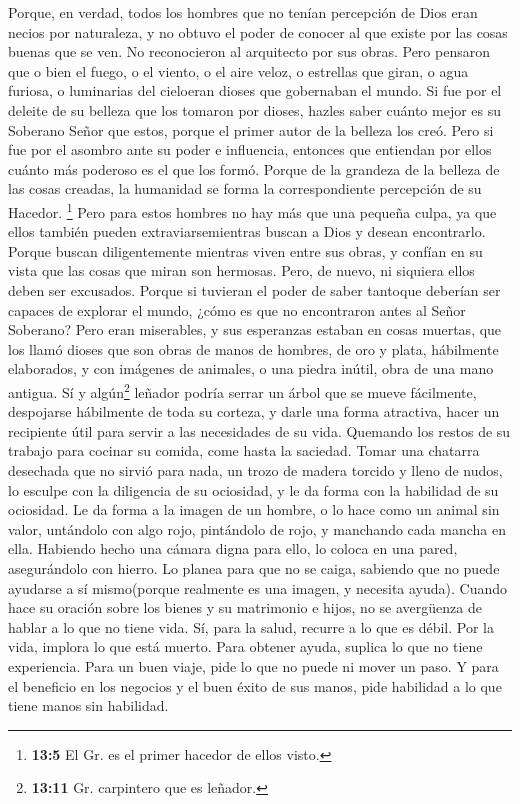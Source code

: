  Porque, en verdad, todos los hombres que no tenían
percepción de Dios eran necios por naturaleza, y no obtuvo el poder de
conocer al que existe por las cosas buenas que se ven. No reconocieron
al arquitecto por sus obras.  Pero pensaron que o bien el
fuego, o el viento, o el aire veloz, o estrellas que giran, o agua
furiosa, o luminarias del cieloeran dioses que gobernaban el mundo.
 Si fue por el deleite de su belleza que los tomaron por
dioses, hazles saber cuánto mejor es su Soberano Señor que estos, porque
el primer autor de la belleza los creó.  Pero si fue por
el asombro ante su poder e influencia, entonces que entiendan por ellos
cuánto más poderoso es el que los formó.  Porque de la
grandeza de la belleza de las cosas creadas, la humanidad se forma la
correspondiente percepción de su Hacedor. \footnote{\textbf{13:5} El Gr.
  es el primer hacedor de ellos visto.}  Pero para estos
hombres no hay más que una pequeña culpa, ya que ellos también pueden
extraviarsemientras buscan a Dios y desean encontrarlo. 
Porque buscan diligentemente mientras viven entre sus obras, y confían
en su vista que las cosas que miran son hermosas.  Pero,
de nuevo, ni siquiera ellos deben ser excusados.  Porque
si tuvieran el poder de saber tantoque deberían ser capaces de explorar
el mundo, ¿cómo es que no encontraron antes al Señor Soberano?
 Pero eran miserables, y sus esperanzas estaban en cosas
muertas, que los llamó dioses que son obras de manos de hombres, de oro
y plata, hábilmente elaborados, y con imágenes de animales, o una piedra
inútil, obra de una mano antigua.  Sí y algún\footnote{\textbf{13:11}
  Gr. carpintero que es leñador.} leñador podría serrar un árbol que se
mueve fácilmente, despojarse hábilmente de toda su corteza, y darle una
forma atractiva, hacer un recipiente útil para servir a las necesidades
de su vida.  Quemando los restos de su trabajo para
cocinar su comida, come hasta la saciedad.  Tomar una
chatarra desechada que no sirvió para nada, un trozo de madera torcido y
lleno de nudos, lo esculpe con la diligencia de su ociosidad, y le da
forma con la habilidad de su ociosidad. Le da forma a la imagen de un
hombre,  o lo hace como un animal sin valor, untándolo
con algo rojo, pintándolo de rojo, y manchando cada mancha en ella.
 Habiendo hecho una cámara digna para ello, lo coloca en
una pared, asegurándolo con hierro.  Lo planea para que
no se caiga, sabiendo que no puede ayudarse a sí mismo(porque realmente
es una imagen, y necesita ayuda).  Cuando hace su oración
sobre los bienes y su matrimonio e hijos, no se avergüenza de hablar a
lo que no tiene vida.  Sí, para la salud, recurre a lo
que es débil. Por la vida, implora lo que está muerto. Para obtener
ayuda, suplica lo que no tiene experiencia. Para un buen viaje, pide lo
que no puede ni mover un paso.  Y para el beneficio en
los negocios y el buen éxito de sus manos, pide habilidad a lo que tiene
manos sin habilidad.

